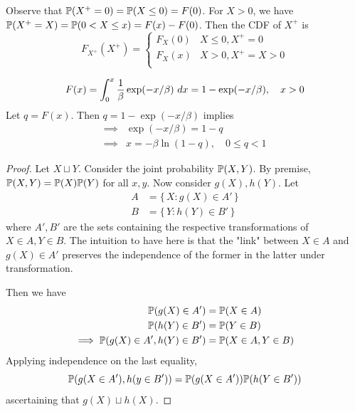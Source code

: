 \documentclass[a4paper]{article}
\begin{document}
Observe that \(\mathbb{P}(X^{+} = 0) = \mathbb{P}(X \le 0) = F(0)\). For \(X > 0\), we have \(\mathbb{P}(X^{+} = X) = \mathbb{P}(0 < X \le x) = F(x) - F(0)\). Then the \textsf{CDF} of \(X^{+}\) is
\[
	F_{X^{+}}(X^{+}) = \begin{cases}
		F_{X}(0) & X \le 0, X^{+} = 0 \\
		F_{X}(x) & X > 0, X^{+} = X > 0 \\
	\end{cases}
\]

\[
	F(x) = \int^{x}_{0} \frac{1}{\beta}\exp(-x/\beta) \ dx = 1 - \exp(-x/\beta),\quad x > 0 \\
\]
Let \(q = F(x)\). Then \(q = 1 - \exp(-x/\beta )\) implies
\begin{align*}
	\implies & \exp(-x/\beta ) = 1-q \\
	\implies & \boxed{x = -\beta \ln(1-q)}, \quad 0 \le q < 1
\end{align*}

\begin{proof}[Proof] 
Let \(X \sqcup Y\). Consider the joint probability \(\mathbb{P}(X,Y)\). By premise, \(\mathbb{P}(X,Y) = \mathbb{P}(X)\mathbb{P}(Y)\) for all \(x,y\). Now consider \(g(X), h(Y)\). Let 
\begin{align*}
	A & = \{\, X \colon g(X) \in A' \,\} \\
	B & = \{\, Y \colon h(Y) \in B'\,\}
\end{align*}
where \(A', B'\) are the sets containing the respective transformations of \(X \in A, Y \in B\). The intuition to have here is that the "link" between \(X \in A\) and \(g(X) \in A'\) preserves the independence of the former in the latter under transformation.

Then we have
\begin{align*}
	\mathbb{P}(g(X) \in A') & = \mathbb{P}(X \in A) \\
	\mathbb{P}(h(Y) \in B') & = \mathbb{P}(Y \in B) \\
	\implies \mathbb{P}(g(X) \in A', h(Y) \in B') & = \mathbb{P}(X \in A, Y \in B)
\end{align*}
Applying independence on the last equality,
\[
	\mathbb{P}(g(X \in A'), h(y \in B')) = \mathbb{P}(g(X \in A'))\mathbb{P}(h(Y \in B'))	
\]
ascertaining that \(g(X) \sqcup h(X)\).
\end{proof}
\end{document}
